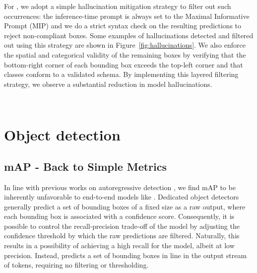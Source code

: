 For \eclair, we adopt a simple hallucination mitigation strategy to filter out such occurrences: the inference-time prompt is always set to the Maximal Informative Prompt (MIP) and we do a strict syntax check on the resulting predictions to reject non-compliant boxes. Some examples of hallucinations detected and filtered out using this strategy are shown in Figure~\ref{fig:hallucinations}. We also enforce the spatial and categorical validity of the remaining boxes by verifying that the bottom-right corner of each bounding box exceeds the top-left corner and that classes conform to a validated schema. By implementing this layered filtering strategy, we observe a substantial reduction in model hallucinations.

\begin{figure*}[htbp]
    \centering
     \\
    \vspace{-3mm}
    \caption{Examples of hallucinations in the \eclair predictions. The hallucinations (in this case, repetition loops), marked in red, are detected and filtered out by our hallucination-mitigation strategy.}
    \vspace{-3mm}
    \label{fig:hallucinations}
\end{figure*}

\section{Object detection}

\subsection{mAP - Back to Simple Metrics}
\label{sec:map}
In line with previous works on autoregressive detection \cite{avetisyan2024scenescriptreconstructingscenesautoregressive}, we find mAP to be inherently unfavorable to end-to-end models like \eclair. Dedicated object detectors generally predict a set of bounding boxes of a fixed size as a raw output, where each bounding box is associated with a confidence score. Consequently, it is possible to control the recall-precision trade-off of the model by adjusting the confidence threshold by which the raw predictions are filtered. Naturally, this results in a possibility of achieving a high recall for the model, albeit at low precision. Instead, \eclair predicts a set of bounding boxes in line in the output stream of tokens, requiring no filtering or thresholding.

